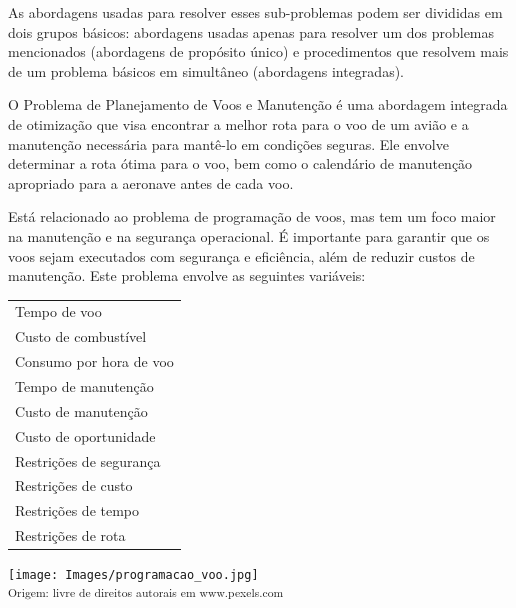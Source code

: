 \documentclass{amsart}
\begin{document}
As abordagens usadas para resolver esses sub-problemas podem ser divididas em dois grupos básicos: abordagens usadas apenas para resolver um dos problemas mencionados (abordagens de propósito único) e procedimentos que resolvem mais de um problema básicos em simultâneo (abordagens integradas).

O Problema de Planejamento de Voos e Manutenção é uma abordagem integrada de otimização que visa encontrar a melhor rota para o voo de um avião e a manutenção necessária para mantê-lo em condições seguras. Ele envolve determinar a rota ótima para o voo, bem como o calendário de manutenção apropriado para a aeronave antes de cada voo.

Está relacionado ao problema de programação de voos, mas tem um foco maior na manutenção e na segurança operacional. É importante para garantir que os voos sejam executados com segurança e eficiência, além de reduzir custos de manutenção. Este problema envolve as seguintes variáveis:

\vspace{0.5cm}

\begin{minipage}[h]{.98\linewidth}
	\begin{minipage}[t]{0.25\linewidth}
		\begin{tabular}{l}
		Tempo de voo\\
		Custo de combustível\\
		Consumo por hora de voo\\
		Tempo de manutenção\\
		Custo de manutenção\\
		Custo de oportunidade\\
		Restrições de segurança\\
		Restrições de custo\\
		Restrições de tempo\\
		Restrições de rota\\
		\end{tabular}
	\end{minipage}
	\hfill
	\begin{minipage}[t]{0.72\linewidth}
		\vspace{-2ex}
		\texttt{[image: Images/programacao\_voo.jpg]}\\
		\small\textsuperscript{Origem: livre de direitos autorais em www.pexels.com}
	\end{minipage}
\end{minipage}
\end{document}
